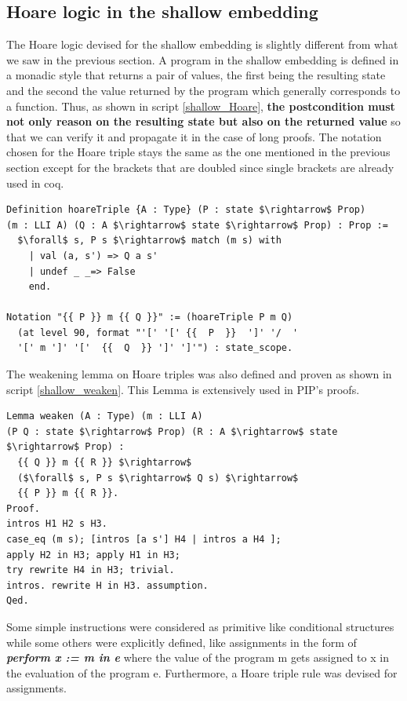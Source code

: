 \subsection{Hoare logic in the shallow embedding} \label{Hoare}
The Hoare logic devised for the shallow embedding is slightly different from what we saw in the previous section. A program in the shallow embedding is defined in a monadic style that returns a pair of values, the first being the resulting state and the second the value returned by the program which generally corresponds to a function. Thus, as shown in script \ref{shallow_Hoare}, \textbf{the postcondition must not only reason on the resulting state but also on the returned value} so that we can verify it and propagate it in the case of long proofs. The notation chosen for the Hoare triple stays the same as the one mentioned in the previous section except for the brackets that are doubled since single brackets are already used in coq.
\begin{lstlisting}[caption = {Hoare triple in the shallow embedding},label = {shallow_Hoare}, mathescape=true,xleftmargin=.02\textwidth,
xrightmargin=.02\textwidth]
Definition hoareTriple {A : Type} (P : state $\rightarrow$ Prop) 
(m : LLI A) (Q : A $\rightarrow$ state $\rightarrow$ Prop) : Prop :=
  $\forall$ s, P s $\rightarrow$ match (m s) with
    | val (a, s') => Q a s'
    | undef _ _=> False
    end.

Notation "{{ P }} m {{ Q }}" := (hoareTriple P m Q)
  (at level 90, format "'[' '[' {{  P  }}  ']' '/  '
  '[' m ']' '['  {{  Q  }} ']' ']'") : state_scope.
\end{lstlisting}
The weakening lemma on Hoare triples was also defined and proven as shown in script \ref{shallow_weaken}. This Lemma is extensively used in PIP's proofs.
\begin{lstlisting}[caption = {Weakening Hoare triples in the shallow embedding},label = {shallow_weaken}, mathescape=true,xleftmargin=.06\textwidth,
xrightmargin=.06\textwidth]
Lemma weaken (A : Type) (m : LLI A) 
(P Q : state $\rightarrow$ Prop) (R : A $\rightarrow$ state $\rightarrow$ Prop) :
  {{ Q }} m {{ R }} $\rightarrow$ 
  ($\forall$ s, P s $\rightarrow$ Q s) $\rightarrow$
  {{ P }} m {{ R }}.
Proof.
intros H1 H2 s H3.
case_eq (m s); [intros [a s'] H4 | intros a H4 ];
apply H2 in H3; apply H1 in H3; 
try rewrite H4 in H3; trivial.
intros. rewrite H in H3. assumption. 
Qed.
\end{lstlisting}
Some simple instructions were considered as primitive like conditional structures while some others were explicitly defined, like assignments in the form of \linebreak \textit{\textbf{perform x := m in e}} where the value of the program m gets assigned to x in the evaluation of the program e. Furthermore, a Hoare triple rule was devised for assignments.

